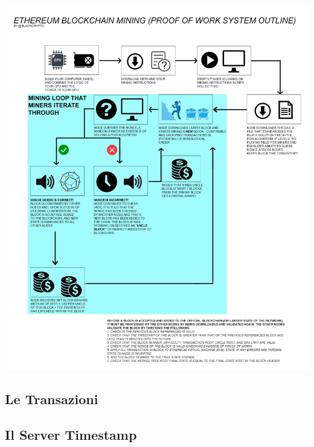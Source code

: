 \documentclass[12pt,a4paper,draft]{article}
\begin{document}
%
\begin{center}
    \includegraphics[width=\linewidth]{img/pow}
\end{center}
%
\subsection{Le Transazioni}
%
%
\subsection{Il Server Timestamp}
%
%
\end{document}
